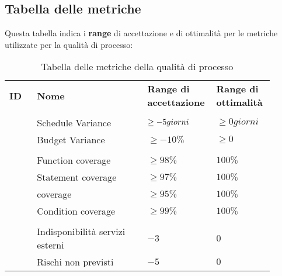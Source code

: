 \documentclass[PianoDiQualifica.tex]{subfiles}
\begin{document}
\subsection{Tabella delle metriche}
Questa tabella indica i \textbf{range} di accettazione e di ottimalità per le metriche utilizzate per la qualità di processo:
\begin{table}[H]
	\begin{center}
		\begin{tabu} to 
			\tableHeaderStyle
			
			\textbf{ID} & \textbf{Nome} & \textbf{Range di accettazione} & \textbf{Range di ottimalità}\\
			
			\\
			 & Schedule Variance & $ \geq -5 \space giorni $ & $ \geq 0 giorni $ \\
			 & Budget Variance & $ \geq -10\% $ & $ \geq 0 $ \\
			
			\hline
			\\
			 & Function coverage & $ \geq 98\% $ & $ 100\% $\\
			 & Statement coverage &  $ \geq 97\% $& $ 100\% $\\
			 &  coverage & $ \geq 95\% $ & $ 100\% $\\
			 & Condition coverage & $ \geq 99\% $ & $ 100\% $\\

			\hline
			\\
			 & Indisponibilità servizi esterni & $ -3 $ & $ 0 $\\
			 & Rischi non previsti & $ -5 $ & $ 0 $\\ 


			
		\end{tabu}
		\caption{Tabella delle metriche della qualità di processo}
		\vspace{-1em}
	\end{center}
\end{table}
\end{document}
